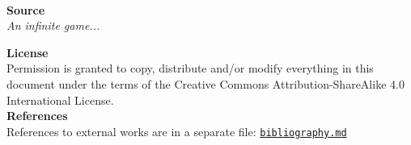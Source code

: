 \documentclass[oneside,hidelinks]{book}
\begin{document}
\thispagestyle{empty}


~
\vspace{129px}

\begin{center}
{\Huge \textbf{Source}}\\
\vspace{10px}
{\textit{An infinite game...}}\\
\end{center}

\vspace{129px}

\begin{center}
\end{center}

\newpage

\restoregeometry


\thispagestyle{empty}

\vspace{20px}

\textbf{License} \\
Permission is granted to copy, distribute and/or modify everything in this document under the terms of the Creative Commons Attribution-ShareAlike 4.0 International License.\\

\textbf{References} \\
References to external works are in a separate file: \href{https://github.com/rjelavic/hello-world/blob/master/bibliography.md}{\texttt{bibliography.md}}\\
\end{document}
